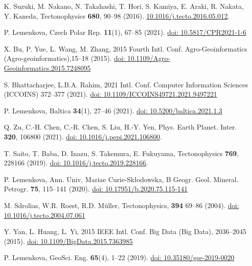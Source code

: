 \documentclass{rrparticle}
\begin{document}
\begin{thebibliography}{99}
 K. Suzuki, M. Nakano, N. Takahashi, T. Hori, S. Kamiya, E. Araki, R. Nakata, Y. Kaneda, Tectonophysics \textbf{680}, 90--98 (2016). \href{https://doi.org/10.1016/j.tecto.2016.05.012}{10.1016/j.tecto.2016.05.012}.

 P. Lemenkova, Czech Polar Rep. \textbf{11}(1), 67--85 (2021). \href{https://doi.org/10.5817/CPR2021-1-6}{doi: 10.5817/CPR2021-1-6}

 X. Bu, P. Yue, L. Wang, M. Zhang, 2015 Fourth Intl. Conf. Agro-Geoinformatics (Agro-geoinformatics),15--18 (2015). \href{https://doi.org/10.1109/Agro-Geoinformatics.2015.7248095}{doi: 10.1109/Agro-Geoinformatics.2015.7248095}

 S. Bhattacharjee, L.B.A. Rahim, 2021 Intl. Conf. Computer Information Sciences (ICCOINS) 372--377 (2021).  \href{https://doi.org/10.1109/ICCOINS49721.2021.9497221}{doi: 10.1109/ICCOINS49721.2021.9497221}

P. Lemenkova, Baltica \textbf{34}(1), 27--46 (2021). \href{https://doi.org/10.5200/baltica.2021.1.3}{doi: 10.5200/baltica.2021.1.3}

 Q. Zu, C.-H. Chen, C.-R. Chen, S. Liu, H.-Y. Yen, Phys. Earth Planet. Inter. \textbf{320}, 106800 (2021). \href{https://doi.org/10.1016/j.pepi.2021.106800}{doi: 10.1016/j.pepi.2021.106800}.

 T. Saito, T. Baba, D. Inazu, S. Takemura, E. Fukuyama, Tectonophysics \textbf{769}, 228166 (2019). \href{https://doi.org/10.1016/j.tecto.2019.228166}{doi: 10.1016/j.tecto.2019.228166}.

P. Lemenkova, Ann. Univ. Mariae Curie-Skłodowska, B Geogr. Geol. Mineral. Petrogr. \textbf{75}, 115--141 (2020). \href{https://doi.org/10.17951/b.2020.75.115-141}{doi: 10.17951/b.2020.75.115-141}

 M. Sdrolias, W.R. Roest, R.D. M\"uller, Tectonophysics, \textbf{394} 69--86 (2004). \href{https://doi.org/10.1016/j.tecto.2004.07.061}{doi: 10.1016/j.tecto.2004.07.061}

 Y. Yan, L. Huang, L. Yi, 2015 IEEE Intl. Conf. Big Data (Big Data), 2036--2045 (2015).  \href{https://doi.org/10.1109/BigData.2015.7363985}{doi: 10.1109/BigData.2015.7363985}

P. Lemenkova, GeoSci. Eng. \textbf{65}(4), 1--22 (2019). \href{https://doi.org/10.35180/gse-2019-0020}{doi: 10.35180/gse-2019-0020}


\end{thebibliography}
\end{document}
